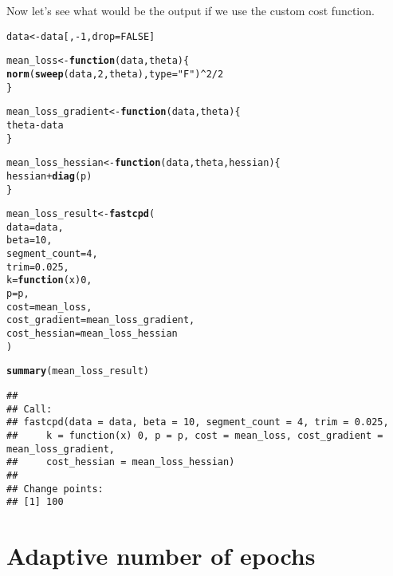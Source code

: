 \documentclass[article]{jss}\usepackage[]{graphicx}\usepackage[]{xcolor}
\makeatletter
\newcommand{\hlnum}[1]{\textcolor[rgb]{0.686,0.059,0.569}{#1}}%
\newcommand{\hlstr}[1]{\textcolor[rgb]{0.192,0.494,0.8}{#1}}%
\newcommand{\hlopt}[1]{\textcolor[rgb]{0,0,0}{#1}}%
\newcommand{\hlstd}[1]{\textcolor[rgb]{0.345,0.345,0.345}{#1}}%
\newcommand{\hlkwa}[1]{\textcolor[rgb]{0.161,0.373,0.58}{\textbf{#1}}}%
\newcommand{\hlkwb}[1]{\textcolor[rgb]{0.69,0.353,0.396}{#1}}%
\newcommand{\hlkwc}[1]{\textcolor[rgb]{0.333,0.667,0.333}{#1}}%
\newcommand{\hlkwd}[1]{\textcolor[rgb]{0.737,0.353,0.396}{\textbf{#1}}}%
\newenvironment{kframe}{%
 \def\at@end@of@kframe{}%
 \ifinner\ifhmode%
  \def\at@end@of@kframe{\end{minipage}}%
  \begin{minipage}{\columnwidth}%
 \fi\fi%
 \def\FrameCommand##1{\hskip\@totalleftmargin \hskip-\fboxsep
 \colorbox{shadecolor}{##1}\hskip-\fboxsep
     \hskip-\linewidth \hskip-\@totalleftmargin \hskip\columnwidth}%
 \MakeFramed {\advance\hsize-\width
   \@totalleftmargin\z@ \linewidth\hsize
   \@setminipage}}%
 {\par\unskip\endMakeFramed%
 \at@end@of@kframe}
\newenvironment{knitrout}{}{} %
\makeatother
\begin{document}
%
Now let's see what would be the output if we use the custom cost function.
%
\begin{knitrout}
\color{fgcolor}\begin{kframe}
\begin{alltt}
\hlstd{data} \hlkwb{<-} \hlstd{data[,} \hlopt{-}\hlnum{1}\hlstd{,} \hlkwc{drop} \hlstd{=} \hlnum{FALSE}\hlstd{]}

\hlstd{mean_loss} \hlkwb{<-} \hlkwa{function}\hlstd{(}\hlkwc{data}\hlstd{,} \hlkwc{theta}\hlstd{) \{}
  \hlkwd{norm}\hlstd{(}\hlkwd{sweep}\hlstd{(data,} \hlnum{2}\hlstd{, theta),} \hlkwc{type} \hlstd{=} \hlstr{"F"}\hlstd{)} \hlopt{^} \hlnum{2} \hlopt{/} \hlnum{2}
\hlstd{\}}

\hlstd{mean_loss_gradient} \hlkwb{<-} \hlkwa{function}\hlstd{(}\hlkwc{data}\hlstd{,} \hlkwc{theta}\hlstd{) \{}
  \hlstd{theta} \hlopt{-} \hlstd{data}
\hlstd{\}}

\hlstd{mean_loss_hessian} \hlkwb{<-} \hlkwa{function}\hlstd{(}\hlkwc{data}\hlstd{,} \hlkwc{theta}\hlstd{,} \hlkwc{hessian}\hlstd{) \{}
  \hlstd{hessian} \hlopt{+} \hlkwd{diag}\hlstd{(p)}
\hlstd{\}}

\hlstd{mean_loss_result} \hlkwb{<-} \hlkwd{fastcpd}\hlstd{(}
  \hlkwc{data} \hlstd{= data,}
  \hlkwc{beta} \hlstd{=} \hlnum{10}\hlstd{,}
  \hlkwc{segment_count} \hlstd{=} \hlnum{4}\hlstd{,}
  \hlkwc{trim} \hlstd{=} \hlnum{0.025}\hlstd{,}
  \hlkwc{k} \hlstd{=} \hlkwa{function}\hlstd{(}\hlkwc{x}\hlstd{)} \hlnum{0}\hlstd{,}
  \hlkwc{p} \hlstd{= p,}
  \hlkwc{cost} \hlstd{= mean_loss,}
  \hlkwc{cost_gradient} \hlstd{= mean_loss_gradient,}
  \hlkwc{cost_hessian} \hlstd{= mean_loss_hessian}
\hlstd{)}

\hlkwd{summary}\hlstd{(mean_loss_result)}
\end{alltt}
\begin{verbatim}
## 
## Call:
## fastcpd(data = data, beta = 10, segment_count = 4, trim = 0.025, 
##     k = function(x) 0, p = p, cost = mean_loss, cost_gradient = mean_loss_gradient, 
##     cost_hessian = mean_loss_hessian)
## 
## Change points:
## [1] 100
\end{verbatim}
\end{kframe}
\end{knitrout}

\section{Adaptive number of epochs} \label{sec:adaptive number of epochs}
\end{document}
